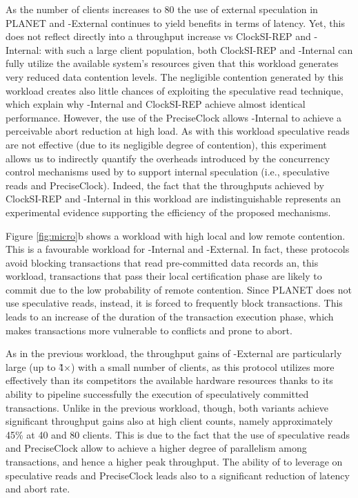 As the number of clients increases to 80 the use of external speculation in PLANET and {\specula}-External  continues to yield benefits in terms of latency. Yet, this does not reflect directly into a throughput increase vs ClockSI-REP and {\specula}-Internal: with such a large client population, both ClockSI-REP and {\specula}-Internal can fully utilize the available system's resources given that this workload generates very reduced data contention levels.
The  negligible contention generated by this workload creates also little chances of exploiting the speculative read technique, which explain why  {\specula}-Internal and ClockSI-REP achieve almost identical performance. However, the use of the PreciseClock allows  {\specula}-Internal to achieve a perceivable abort reduction at high load. As with this workload speculative reads are not effective (due to its negligible degree of contention), this experiment allows us to indirectly quantify the overheads introduced by the concurrency control mechanisms used by \specula to support internal speculation (i.e., speculative reads and PreciseClock). Indeed, the fact that the throughputs achieved by ClockSI-REP and  {\specula}-Internal in this workload are  indistinguishable represents an experimental evidence supporting the efficiency of the proposed mechanisms.


Figure \ref{fig:micro}b shows a workload with high local and low remote contention. This is a favourable workload for {\specula}-Internal and {\specula}-External. In fact, these protocols avoid blocking transactions that read pre-committed data records an, this workload, transactions that pass their local certification phase are likely to commit due to the low probability of remote contention. Since PLANET does not use speculative reads, instead, it is forced to frequently block transactions. This leads to an increase of the duration of the transaction execution phase, which makes transactions more vulnerable to conflicts and prone to abort.

As in the previous workload, the throughput gains of  {\specula}-External are particularly large (up to \~4$\times$) with a small number of clients, as this protocol utilizes more effectively than its competitors the available hardware resources thanks to its ability to pipeline successfully the execution of speculatively committed transactions. Unlike in the previous workload, though, both 
\specula variants achieve significant throughput gains also at high client counts, namely approximately 45\% at 40 and 80 clients. This is due to the fact that the use of speculative reads and PreciseClock allow \specula to achieve a higher degree of parallelism among transactions, and hence a higher peak throughput. The ability of \specula to leverage on speculative reads and PreciseClock leads also to a significant reduction of latency and abort rate.

